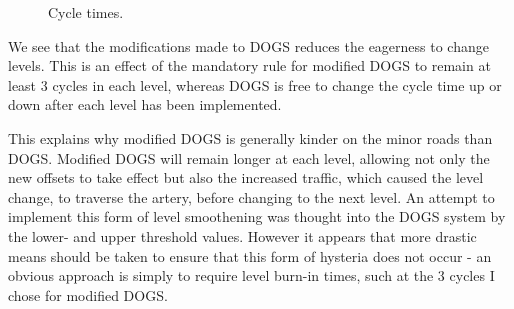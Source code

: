 \begin{figure}[htbp]
\caption{Cycle times.}
\label{fig:dogs_cycle_times}
\end{figure}

We see that the modifications made to DOGS reduces the eagerness to change levels. This is an effect of the mandatory rule for modified DOGS to remain at least 3 cycles in each level, whereas DOGS is free to change the cycle time up or down after each level has been implemented. 

This explains why modified DOGS is generally kinder on the minor roads than DOGS. Modified DOGS will remain longer at each level, allowing not only the new offsets to take effect but also the increased traffic, which caused the level change, to traverse the artery, before changing to the next level. An attempt to implement this form of level smoothening was thought into the DOGS system by the lower- and upper threshold values. However it appears that more drastic means should be taken to ensure that this form of hysteria does not occur - an obvious approach is simply to require level burn-in times, such at the 3 cycles I chose for modified DOGS.

